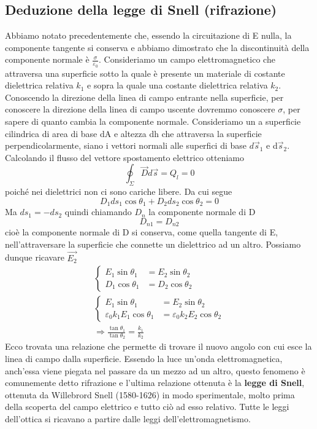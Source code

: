 \documentclass[10pt,a4paper]{article}
\begin{document}
\subsection{Deduzione della legge di Snell (rifrazione)}
Abbiamo notato precedentemente che, essendo la circuitazione di E nulla, la componente tangente si conserva e abbiamo dimostrato che la discontinuità della componente normale è $\frac{\sigma}{\varepsilon_0}$. Consideriamo un campo elettromagnetico che attraversa una superficie sotto la quale è presente un materiale di costante dielettrica relativa \(k_1\) e sopra la quale una costante dielettrica relativa \(k_2\). Conoscendo la direzione della linea di campo entrante nella superficie, per conoscere la direzione della linea di campo uscente dovremmo conoscere $\sigma$, per sapere di quanto cambia la componente normale. Consideriamo un a superficie cilindrica di area di base dA e altezza dh che attraversa la superficie perpendicolarmente, siano i vettori normali alle superfici di base \(d\vec{s}_1\) e d\(\vec{s}_2\). Calcolando il flusso del vettore spostamento elettrico otteniamo
\[\oint_{\Sigma}\vec{D}d\vec{s} = Q_l = 0\]
poiché nei dielettrici non ci sono cariche libere. Da cui segue
\[D_1ds_1\cos\theta_1 + D_2ds_2\cos\theta_2 = 0\]
Ma \(ds_1 = -ds_2\) quindi chiamando \(D_n\) la componente normale di D
\[D_{n1} = D_{n2}\]
cioè la componente normale di D si conserva, come quella tangente di E, nell'attraversare la superficie che connette un dielettrico ad un altro. Possiamo dunque ricavare $\vec{E_2}$
\begin{align*}
	\begin{cases}
		E_1\sin\theta_1 &= E_2\sin\theta_2 \\
		D_1\cos\theta_1 &= D_2\cos\theta_2 
	\end{cases}
\\
	\begin{cases}
		E_1\sin\theta_1 &= E_2\sin\theta_2 \\
		\varepsilon_0k_1E_1\cos\theta_1 &= \varepsilon_0k_2E_2\cos\theta_2 
	\end{cases}
\\
	\Rightarrow \frac{\tan\theta_1}{\tan\theta_2} = \frac{k_1}{k_2}
\end{align*}
Ecco trovata una relazione che permette di trovare il nuovo angolo con cui esce la linea di campo dalla superficie. Essendo la luce un'onda elettromagnetica, anch'essa viene piegata nel passare da un mezzo ad un altro, questo fenomeno è comunemente detto rifrazione e l'ultima relazione ottenuta è la \textbf{legge di Snell}, ottenuta da Willebrord Snell (1580-1626) in modo sperimentale, molto prima della scoperta del campo elettrico e tutto ciò ad esso relativo. Tutte le leggi dell'ottica si ricavano a partire dalle leggi dell'elettromagnetismo. 
\end{document}

